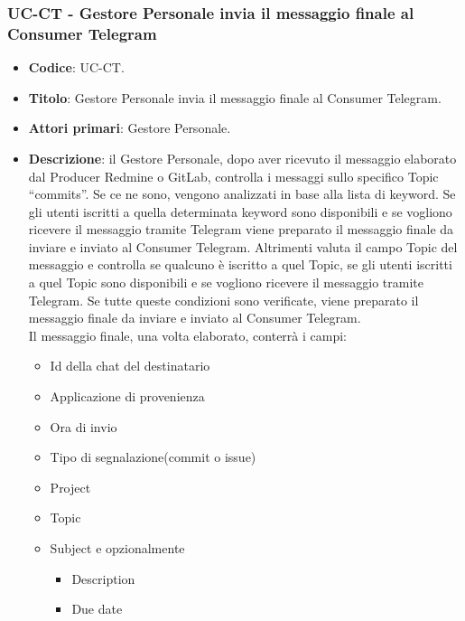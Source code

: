 \subsubsection{UC\theuccount-CT - Gestore Personale invia il messaggio finale al Consumer Telegram}
	\begin{itemize}
		\item \textbf{Codice}: UC\theuccount-CT.
		\item \textbf{Titolo}: Gestore Personale invia il messaggio finale al Consumer Telegram.
		\item \textbf{Attori primari}: Gestore Personale.
		\item \textbf{Descrizione}: il Gestore Personale, dopo aver ricevuto il messaggio elaborato
		dal Producer Redmine o GitLab, controlla i messaggi sullo specifico Topic ``commits''.
		Se ce ne sono, vengono analizzati in base alla	lista di keyword.
		Se gli utenti iscritti a quella determinata keyword sono disponibili e se vogliono ricevere il messaggio tramite Telegram viene preparato
		il messaggio finale da inviare e inviato al Consumer Telegram.
		Altrimenti valuta il campo Topic del messaggio e controlla se qualcuno è iscritto a quel Topic, se gli utenti iscritti a quel Topic sono disponibili e
		se vogliono ricevere il messaggio tramite Telegram.
		Se tutte queste condizioni sono verificate, viene preparato il messaggio finale da inviare e inviato al Consumer Telegram.\\
		Il messaggio finale, una volta elaborato, conterrà i campi:
		\begin{itemize}
			\item Id della chat del destinatario
			\item Applicazione di provenienza
			\item Ora di invio
			\item Tipo di segnalazione(commit o issue)
			\item Project
			\item Topic
			\item Subject e opzionalmente
		 	\begin{itemize}
				\item Description
				\item Due date

\end{itemize}
\end{itemize}
\end{itemize}

